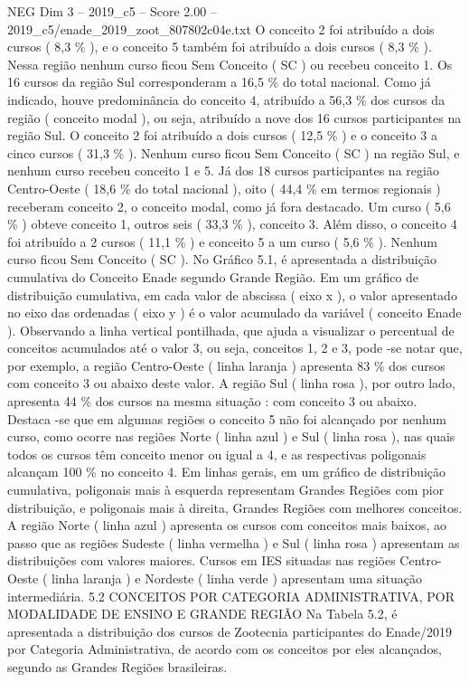 \begin{textsample}{NEG Dim 3 – 2019\_c5 – Score 2.00 – 2019\_c5/enade\_2019\_zoot\_807802c04e.txt}
O conceito 2 foi atribuído a dois cursos ( 8,3 \% ), e o conceito 5 também foi atribuído a dois cursos ( 8,3 \% ).
Nessa região nenhum curso ficou Sem Conceito ( SC ) ou recebeu conceito 1.
Os 16 cursos da região Sul corresponderam a 16,5 \% do total nacional.
Como já indicado, houve predominância do conceito 4, atribuído a 56,3 \% dos cursos da região ( conceito modal ), ou seja, atribuído a nove dos 16 cursos participantes na região Sul.
O conceito 2 foi atribuído a dois cursos ( 12,5 \% ) e o conceito 3 a cinco cursos ( 31,3 \% ).
Nenhum curso ficou Sem Conceito ( SC ) na região Sul, e nenhum curso recebeu conceito 1 e 5.
Já dos 18 cursos participantes na região Centro-Oeste ( 18,6 \% do total nacional ), oito ( 44,4 \% em termos regionais ) receberam conceito 2, o conceito modal, como já fora destacado.
Um curso ( 5,6 \% ) obteve conceito 1, outros seis ( 33,3 \% ), conceito 3.
Além disso, o conceito 4 foi atribuído a 2 cursos ( 11,1 \% ) e conceito 5 a um curso ( 5,6 \% ).
Nenhum curso ficou Sem Conceito ( SC ).
No Gráfico 5.1, é apresentada a distribuição cumulativa do Conceito Enade segundo Grande Região.
Em um gráfico de distribuição cumulativa, em cada valor de abscissa ( eixo x ), o valor apresentado no eixo das ordenadas ( eixo y ) é o valor acumulado da variável ( conceito Enade ).
Observando a linha vertical pontilhada, que ajuda a visualizar o percentual de conceitos acumulados até o valor 3, ou seja, conceitos 1, 2 e 3, pode -se notar que, por exemplo, a região Centro-Oeste ( linha laranja ) apresenta 83 \% dos cursos com conceito 3 ou abaixo deste valor.
A região Sul ( linha rosa ), por outro lado, apresenta 44 \% dos cursos na mesma situação : com conceito 3 ou abaixo.
Destaca -se que em algumas regiões o conceito 5 não foi alcançado por nenhum curso, como ocorre nas regiões Norte ( linha azul ) e Sul ( linha rosa ), nas quais todos os cursos têm conceito menor ou igual a 4, e as respectivas poligonais alcançam 100 \% no conceito 4.
Em linhas gerais, em um gráfico de distribuição cumulativa, poligonais mais à esquerda representam Grandes Regiões com pior distribuição, e poligonais mais à direita, Grandes Regiões com melhores conceitos.
A região Norte ( linha azul ) apresenta os cursos com conceitos mais baixos, ao passo que as regiões Sudeste ( linha vermelha ) e Sul ( linha rosa ) apresentam as distribuições com valores maiores.
Cursos em IES situadas nas regiões Centro-Oeste ( linha laranja ) e Nordeste ( linha verde ) apresentam uma situação intermediária. 5.2 CONCEITOS POR CATEGORIA ADMINISTRATIVA, POR MODALIDADE DE ENSINO E GRANDE REGIÃO Na Tabela 5.2, é apresentada a distribuição dos cursos de Zootecnia participantes do Enade/2019 por Categoria Administrativa, de acordo com os conceitos por eles alcançados, segundo as Grandes Regiões brasileiras.

\end{textsample}
